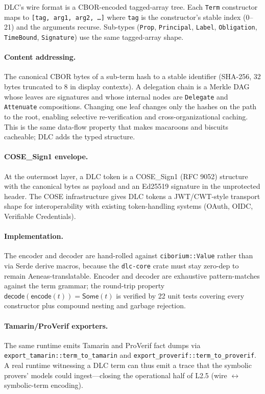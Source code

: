 
DLC's wire format is a CBOR-encoded tagged-array tree.  Each \texttt{Term}
constructor maps to \texttt{[tag, arg1, arg2, \ldots]} where \texttt{tag}
is the constructor's stable index (0--21) and the arguments recurse.
Sub-types (\texttt{Prop}, \texttt{Principal}, \texttt{Label},
\texttt{Obligation}, \texttt{TimeBound}, \texttt{Signature}) use the
same tagged-array shape.

\paragraph{Content addressing.}  The canonical CBOR bytes of a sub-term
hash to a stable identifier (SHA-256, 32 bytes truncated to 8 in
display contexts).  A delegation chain is a Merkle DAG whose leaves
are signatures and whose internal nodes are \texttt{Delegate} and
\texttt{Attenuate} compositions.  Changing one leaf changes only the
hashes on the path to the root, enabling selective re-verification
and cross-organizational caching.  This is the same data-flow
property that makes macaroons and biscuits cacheable; DLC adds the
typed structure.

\paragraph{COSE\_Sign1 envelope.}  At the outermost layer, a DLC
token is a COSE\_Sign1 (RFC 9052) structure with the canonical
bytes as payload and an Ed25519 signature in the unprotected header.
The COSE infrastructure gives DLC tokens a JWT/CWT-style transport
shape for interoperability with existing token-handling systems
(OAuth, OIDC, Verifiable Credentials).

\paragraph{Implementation.}  The encoder and decoder are hand-rolled
against \texttt{ciborium::Value} rather than via Serde derive
macros, because the \texttt{dlc-core} crate must stay zero-dep to
remain Aeneas-translatable.  Encoder and decoder are exhaustive
pattern-matches against the term grammar; the round-trip property
$\mathsf{decode}(\mathsf{encode}(t)) = \mathsf{Some}(t)$ is verified by
22 unit tests covering every constructor plus compound nesting and
garbage rejection.

\paragraph{Tamarin/ProVerif exporters.}  The same runtime emits
Tamarin and ProVerif fact dumps via
\texttt{export\_tamarin::term\_to\_tamarin} and
\texttt{export\_proverif::term\_to\_proverif}.  A real runtime
witnessing a DLC term can thus emit a trace that the symbolic
provers' models could ingest---closing the operational half of L2.5
(wire $\leftrightarrow$ symbolic-term encoding).
